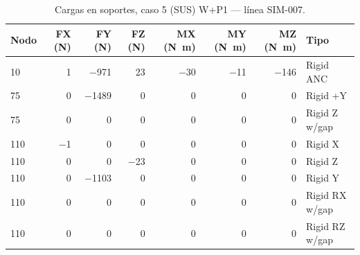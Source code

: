 \begin{table}[htbp]
  \centering
  \footnotesize
  \caption{Cargas en soportes, caso 5 (SUS) W+P1 — línea SIM-007.}
  \label{tab:restricciones-sus}
  \begin{tabular}{lrrrrrrl}
    \toprule
    Nodo & FX (\si{N}) & FY (\si{N}) & FZ (\si{N}) & MX (\si{N.m}) & MY (\si{N.m}) & MZ (\si{N.m}) & Tipo \\
    \midrule
    10 & \num{1} & \num{-971} & \num{23} & \num{-30} & \num{-11} & \num{-146} & Rigid ANC \\
    75 & \num{0} & \num{-1489} & \num{0} & \num{0} & \num{0} & \num{0} & Rigid +Y \\
    75 & \num{0} & \num{0} & \num{0} & \num{0} & \num{0} & \num{0} & Rigid Z w/gap \\
    110 & \num{-1} & \num{0} & \num{0} & \num{0} & \num{0} & \num{0} & Rigid X \\
    110 & \num{0} & \num{0} & \num{-23} & \num{0} & \num{0} & \num{0} & Rigid Z \\
    110 & \num{0} & \num{-1103} & \num{0} & \num{0} & \num{0} & \num{0} & Rigid Y \\
    110 & \num{0} & \num{0} & \num{0} & \num{0} & \num{0} & \num{0} & Rigid RX w/gap \\
    110 & \num{0} & \num{0} & \num{0} & \num{0} & \num{0} & \num{0} & Rigid RZ w/gap \\
    \bottomrule
  \end{tabular}
\end{table}
